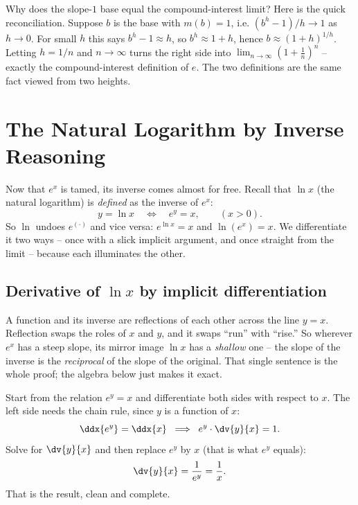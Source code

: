 \begin{connectionbox}
Why does the slope-$1$ base equal the compound-interest limit? Here is the
quick reconciliation. Suppose $b$ is the base with $m(b)=1$, i.e.
$(b^h-1)/h \to 1$ as $h\to 0$. For small $h$ this says $b^h - 1 \approx h$,
so $b^h \approx 1+h$, hence $b \approx (1+h)^{1/h}$. Letting $h = 1/n$ and
$n\to\infty$ turns the right side into $\lim_{n\to\infty}(1+\tfrac1n)^n$ --
exactly the compound-interest definition of $e$. The two definitions are the
same fact viewed from two heights.
\end{connectionbox}

\section{The Natural Logarithm by Inverse Reasoning}
\label{ch12:ln}

Now that $e^x$ is tamed, its inverse comes almost for free. Recall that
$\ln x$ (the natural logarithm) is \emph{defined} as the inverse of $e^x$:
\[
   y = \ln x \quad\Longleftrightarrow\quad e^y = x,\qquad (x>0).
\]
So $\ln$ undoes $e^{(\cdot)}$ and vice versa: $e^{\ln x} = x$ and
$\ln(e^x)=x$. We differentiate it two ways -- once with a slick implicit
argument, and once straight from the limit -- because each illuminates the
other.

\subsection{Derivative of $\ln x$ by implicit differentiation}

\begin{intuitionbox}
A function and its inverse are reflections of each other across the line
$y=x$. Reflection swaps the roles of $x$ and $y$, and it swaps ``run'' with
``rise.'' So wherever $e^x$ has a steep slope, its mirror image $\ln x$ has
a \emph{shallow} one -- the slope of the inverse is the \emph{reciprocal} of
the slope of the original. That single sentence is the whole proof; the
algebra below just makes it exact.
\end{intuitionbox}

Start from the relation $e^y = x$ and differentiate both sides with respect
to $x$. The left side needs the chain rule, since $y$ is a function of $x$:
\[
   \ddx{e^y} = \ddx{x}
   \;\;\Longrightarrow\;\;
   e^y \cdot \dv{y}{x} = 1.
\]
Solve for $\dv{y}{x}$ and then replace $e^y$ by $x$ (that is what $e^y$
equals):
\[
   \dv{y}{x} = \frac{1}{e^y} = \frac{1}{x}.
\]
That is the result, clean and complete.

